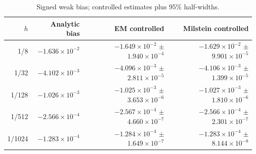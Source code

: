 \begin{table}[H]\centering\small
\caption{Signed weak bias; controlled estimates plus 95\% half-widths.}
\label{tab:gbm-weak}
\begin{tabular}{rrrr}\toprule
$h$ & Analytic bias & EM controlled & Milstein controlled\\\midrule
1/8 & $-1.636\times10^{-2}$ & $-1.649\times10^{-2}$ $\pm$ $1.940\times10^{-4}$ & $-1.629\times10^{-2}$ $\pm$ $9.901\times10^{-5}$\\
1/32 & $-4.102\times10^{-3}$ & $-4.096\times10^{-3}$ $\pm$ $2.811\times10^{-5}$ & $-4.106\times10^{-3}$ $\pm$ $1.399\times10^{-5}$\\
1/128 & $-1.026\times10^{-3}$ & $-1.025\times10^{-3}$ $\pm$ $3.653\times10^{-6}$ & $-1.027\times10^{-3}$ $\pm$ $1.810\times10^{-6}$\\
1/512 & $-2.566\times10^{-4}$ & $-2.567\times10^{-4}$ $\pm$ $4.660\times10^{-7}$ & $-2.566\times10^{-4}$ $\pm$ $2.301\times10^{-7}$\\
1/1024 & $-1.283\times10^{-4}$ & $-1.284\times10^{-4}$ $\pm$ $1.649\times10^{-7}$ & $-1.283\times10^{-4}$ $\pm$ $8.144\times10^{-8}$\\
\bottomrule\end{tabular}
\end{table}

